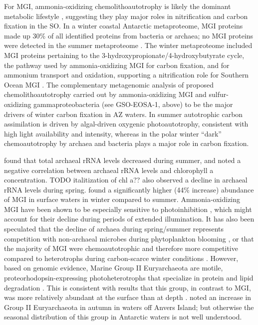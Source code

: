 For \ac{MGI}, ammonia-oxidizing chemolithoautotrophy is likely the dominant metabolic lifestyle \cite{Ingalls:2006kv,Berg:2007fj}, suggesting they play major roles in nitrification and carbon fixation in the \ac{SO}.
In a winter coastal Antarctic metaproteome, \ac{MGI} proteins made up 30\% of all identified proteins from bacteria or archaea; no \ac{MGI} proteins were detected in the summer metaproteome \cite{Williams:2012bs}.
The winter metaproteome included \ac{MGI} proteins pertaining to the 3-hydroxypropionate/4-hydroxybutyrate cycle, the pathway used by ammonia-oxidizing \ac{MGI} for carbon fixation, and for ammonium transport and oxidation, supporting a nitrification role for Southern Ocean \ac{MGI} \cite{Williams:2012bs}.
The complementary metagenomic analysis of \citet{Grzymski:2012ej} proposed chemolithoautotrophy carried out by ammonia-oxidizing \ac{MGI} and sulfur-oxidizing gammaproteobacteria (see GSO-EOSA-1, above) to be the major drivers of winter carbon fixation in \ac{AZ} waters.
In summer autotrophic carbon assimilation is driven by algal-driven oxygenic photoautotrophy, consistent with high light availability and intensity, whereas in the polar winter ``dark'' chemoautotrophy by archaea and bacteria plays a major role in carbon fixation.

\citet{Murray:1998wy} found that total archaeal rRNA levels decreased during summer, and noted a negative correlation between archaeal rRNA levels and chlorophyll a concentration.
TODO italitization of chl a??
\citet{Massana:1998tn} also observed a decline in archaeal rRNA levels during spring.
\citet{Church:2003vt} found a significantly higher (44\% increase) abundance of \ac{MGI} in surface waters in winter compared to summer.
Ammonia-oxidizing \ac{MGI} have been shown to be especially sensitive to photoinhibition \cite{Merbt:2011bl}, which might account for their decline during periods of extended illumination.
It has also been speculated that the decline of archaea during spring/summer represents competition with non-archaeal microbes during phytoplankton blooming \cite{Massana:1998tn}, or that the majority of \ac{MGI} were chemoautotrophic and therefore more competitive compared to heterotrophs during carbon-scarce winter conditions \cite{Murray:1998wy}.
However, based on genomic evidence, Marine Group II Euryarchaeota are motile, proteorhodopsin-expressing photoheterotrophs that specialize in protein and lipid degradation \cite{Iverson:2012kc}.
This is consistent with results that this group, in contrast to \ac{MGI}, was more relatively abundant at the surface than at depth \cite{Massana:1998tn}.
\citet{Murray:1998wy} noted an increase in Group II Euryarchaeota in autumn in waters off Anvers Island; but otherwise the seasonal distribution of this group in Antarctic waters is not well understood.

